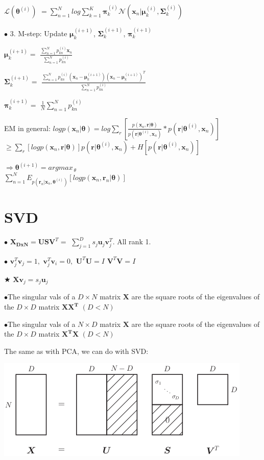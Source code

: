 \documentclass[10pt,a4paper,landscape]{article}
\renewcommand{\bf}[1]{\ensuremath{\mathbf{#1}}}
\newcommand{\btheta}{\boldsymbol\theta}
\begin{document}
\begin{multicols*}{6}
$\mathcal{L}(\btheta^{(i)})$ $= \sum_{n=1}^N log \sum_{k=1}^K \bf{\pi}_k^{(i)} \mathcal{N}(\bf{x}_n | \bf{\mu}_k^{(i)}, \bf{\Sigma}_k^{(i)})$

$\bullet$ 3. M-step: Update $\bf{\mu}_k^{(i+1)}$, $\bf{\Sigma}_k^{(i+1)}$, $\bf{\pi}_k^{(i+1)}$

$\bf{\mu}_k^{(i+1)}=$ $\frac{\sum_{n=1}^N p_{kn}^{(i)}\bf{x}_n}{\sum_{n=1}^Np_{kn}^{(i)}}$

$\bf{\Sigma}_k^{(i+1)}=$ $\frac{\sum_{n=1}^N p_{kn}^{(i)}(\bf{x}_n-\bf{\mu}_k^{(i+1)})(\bf{x}_n-\bf{\mu}_k^{(i+1)})^T}{\sum_{n=1}^Np_{kn}^{(i)}}$

$\bf{\pi}_k^{(i+1)}=$ $\frac{1}{N}\sum_{n=1}^Np_{kn}^{(i)}$

EM in general: 
$log p(\bf{x}_n|\btheta)=log\sum_r[\frac{p(\bf{x}_n,\bf{r}|\btheta)}{p(\bf{r}|\btheta^{(i)},\bf{x}_n)}\ast p(\bf{r}|\btheta^{(i)},\bf{x}_n) ]$
$\geq \sum_r[logp(\bf{x}_n, \bf{r}|\btheta)]p(\bf{r}|\btheta^{(i)},\bf{x}_n) + H[p(\bf{r}|\btheta^{(i)},\bf{x}_n)]$

$\Rightarrow\btheta^{(i+1)} = argmax_{\,\theta} $\\
$\sum_{n=1}^N E_{p(\bf{r}_n|\bf{x}_n,\btheta^{(i)})}[log p(\bf{x}_n,\bf{r}_n|\btheta)]$



\section{SVD}

$\bullet$ $\bf{X_{DxN}=USV}^T=$ $\sum_{j=1}^Ds_j\bf{u}_j\bf{v}_j^T$. All rank 1.

$\bullet$ $\bf{v}_j^T\bf{v}_j=1,$ $\bf{v}_j^T\bf{v}_i=0,$ $\bf{U}^T\bf{U}=I$ $\bf{V}^T\bf{V}=I$  

$\bigstar$ $\bf{X}\bf{v}_j=s_j\bf{u}_j$

$\bullet$The singular vals of a $D \times N$ matrix $\bf{X}$ are the square roots of the eigenvalues of the $D \times D$ matrix $\bf{X X^T}$ $(D<N)$

$\bullet$The singular vals of a $N \times D$ matrix $\bf{X}$ are the square roots of the eigenvalues of the $D \times D$ matrix $\bf{X^T X}$ $(D<N)$


The same as with PCA, we can do with SVD:
\begin{colfig}
  \centering
  \includegraphics[width=\linewidth]{images/svd.png}
\end{colfig}



\end{multicols*}
\end{document}
